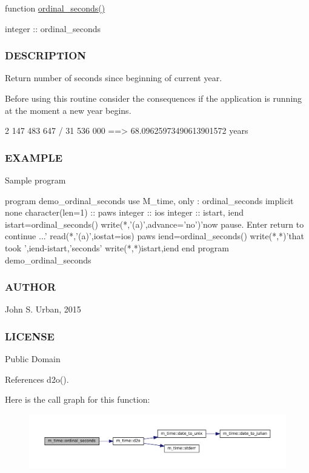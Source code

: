 function \mbox{\hyperlink{namespacem__time_ab8960d2aa60e134bcf77247d8b257963}{ordinal\+\_\+seconds()}}

integer \+:\+: ordinal\+\_\+seconds \subsubsection*{D\+E\+S\+C\+R\+I\+P\+T\+I\+ON}

Return number of seconds since beginning of current year.

Before using this routine consider the consequences if the application is running at the moment a new year begins. \begin{DoxyVerb} 2 147 483 647 / 31 536 000 ==> 68.09625973490613901572 years
\end{DoxyVerb}
 \subsubsection*{E\+X\+A\+M\+P\+LE}

\begin{DoxyVerb}Sample program

 program demo_ordinal_seconds
 use M_time, only : ordinal_seconds
 implicit none
 character(len=1) :: paws
 integer          :: ios
 integer          :: istart, iend
 istart=ordinal_seconds()
 write(*,'(a)',advance='no')'now pause. Enter return to continue ...'
 read(*,'(a)',iostat=ios) paws
 iend=ordinal_seconds()
 write(*,*)'that took ',iend-istart,'seconds'
 write(*,*)istart,iend
 end program demo_ordinal_seconds
\end{DoxyVerb}
 \subsubsection*{A\+U\+T\+H\+OR}

John S. Urban, 2015 \subsubsection*{L\+I\+C\+E\+N\+SE}

Public Domain 

References d2o().

Here is the call graph for this function\+:\nopagebreak
\begin{figure}[H]
\begin{center}
\leavevmode
\includegraphics[width=350pt]{namespacem__time_ab8960d2aa60e134bcf77247d8b257963_cgraph}
\end{center}
\end{figure}
\mbox{\label{namespacem__time_aa4dca4409bf20a011bb04988c1335d63}} 
